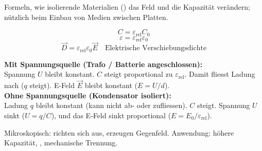 \begin{runintext}
Formeln, wie isolierende Materialien () das Feld und die Kapazität verändern; nützlich beim Einbau von Medien zwischen Platten.
\end{runintext}
\begin{formulabox}
\[ C = \varepsilon_{\mathrm{rel}} C_0 \]
\[ \varepsilon = \varepsilon_{\mathrm{rel}}\varepsilon_0 \]
\formulasep
\[ \vec{D} = \varepsilon_{\mathrm{rel}}\varepsilon_0 \vec{E} \quad \text{Elektrische Verschiebungsdichte} \]
\end{formulabox}
\begin{defbox}
\textbf{Mit Spannungsquelle (Trafo / Batterie angeschlossen):}\\
Spannung $U$ bleibt konstant. $C$ steigt proportional zu $\varepsilon_{\mathrm{rel}}$. Damit fliesst Ladung nach ($q$ steigt). E-Feld $\vec{E}$ bleibt konstant ($E = U/d$).\\[2pt]
\textbf{Ohne Spannungsquelle (Kondensator isoliert):}\\
Ladung $q$ bleibt konstant (kann nicht ab- oder zufliessen). $C$ steigt. Spannung $U$ sinkt ($U=q/C$), und das E-Feld sinkt proportional ($E = E_0 / \varepsilon_{\mathrm{rel}}$).
\end{defbox}
\begin{runintext}
Mikroskopisch:  richten sich aus, erzeugen Gegenfeld. Anwendung: höhere Kapazität, , mechanische Trennung.
\end{runintext}


